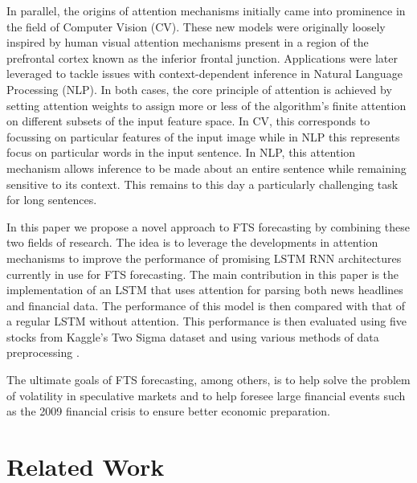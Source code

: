 \documentclass{article}
\begin{document}
In parallel, the origins of attention mechanisms initially came into prominence in the field of Computer Vision (CV). These new models were originally loosely inspired by human visual attention mechanisms present in a region of the prefrontal cortex known as the inferior frontal junction. Applications were later leveraged to tackle issues with context-dependent inference in Natural Language Processing (NLP).  In both cases, the core principle of attention is achieved by setting attention weights to assign more or less of the algorithm’s finite attention on different subsets of the input feature space. In CV, this corresponds to focussing on particular features of the input image while in NLP this represents focus on particular words in the input sentence. In NLP, this attention mechanism allows inference to be made about an entire sentence while remaining sensitive to its context. This remains to this day a particularly challenging task for long sentences.

In this paper we propose a novel approach to FTS forecasting by combining these two fields of research. The idea is to leverage the developments in attention mechanisms to improve the performance of promising LSTM RNN architectures currently in use for FTS forecasting. The main contribution in this paper is the implementation of an LSTM that uses attention for parsing both news headlines and financial data. The performance of this model is then compared with that of a regular LSTM without attention. This performance is then evaluated using five stocks from Kaggle's Two Sigma dataset \cite{kaggle2017twosigma} and using various methods of data preprocessing \cite{bergmeir2012use}. 

The ultimate goals of FTS forecasting, among others, is to help solve the problem of volatility in speculative markets and to help foresee large financial events such as the 2009 financial crisis to ensure better economic preparation. 

\section{Related Work}
\end{document}
